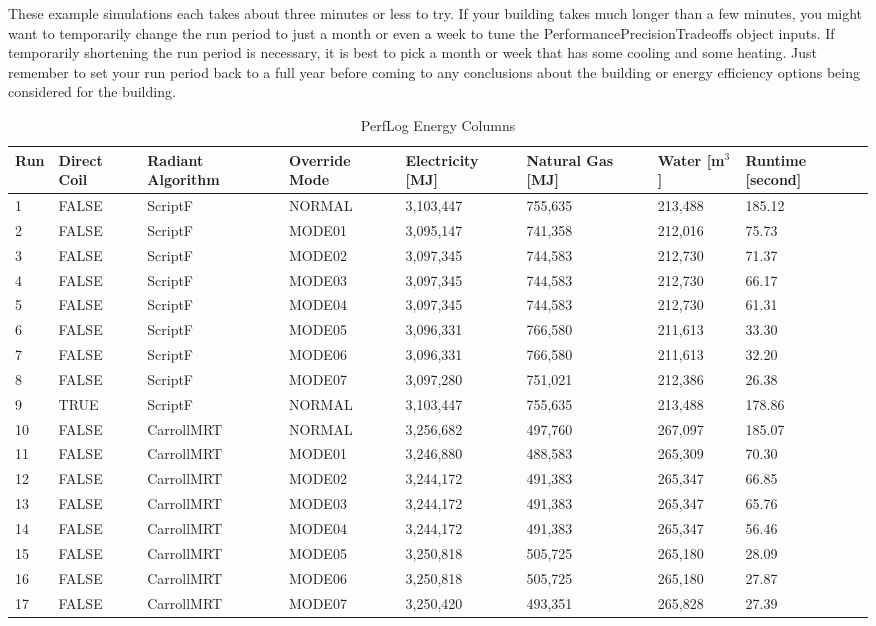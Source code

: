 These example simulations each takes about three minutes or less to try. If your building takes much longer than a few minutes, you might want to temporarily change the run period to just a month or even a week to tune the PerformancePrecisionTradeoffs object inputs. If temporarily shortening the run period is necessary, it is best to pick a month or week that has some cooling and some heating. Just remember to set your run period back to a full year before coming to any conclusions about the building or energy efficiency options being considered for the building.

{\scriptsize
\begin{longtable}[c]{p{0.2in}p{0.4in}p{0.55in}p{0.7in}p{0.5in}p{0.5in}p{0.7in}p{0.6in}}
\caption{PerfLog Energy Columns\label{table:perflog_energy_columns}} \tabularnewline
\toprule
Run &
Direct Coil &
Radiant Algorithm &
Override Mode &
  Electricity {[}MJ{]} &
  Natural Gas {[}MJ{]} &
  Water {[}m$^3${]} &
  Runtime {[}second{]} \tabularnewline
\midrule
\endfirsthead

1  & FALSE & ScriptF  & NORMAL &  3,103,447 &	 755,635 &	 213,488 &	185.12 \tabularnewline
2  & FALSE & ScriptF  & MODE01 &  3,095,147 &	 741,358 &	 212,016 &	75.73  \tabularnewline
3  & FALSE & ScriptF  & MODE02 &  3,097,345 &	 744,583 &	 212,730 &	71.37  \tabularnewline
4  & FALSE & ScriptF  & MODE03 &  3,097,345 &	 744,583 &	 212,730 &	66.17  \tabularnewline
5  & FALSE & ScriptF  & MODE04 &  3,097,345 &	 744,583 &	 212,730 &	61.31  \tabularnewline
6  & FALSE & ScriptF  & MODE05 &  3,096,331 &	 766,580 &	 211,613 &	33.30  \tabularnewline
7  & FALSE & ScriptF  & MODE06 &  3,096,331 &	 766,580 &	 211,613 &	32.20  \tabularnewline
8  & FALSE & ScriptF  & MODE07 &  3,097,280 &	 751,021 &	 212,386 &	26.38  \tabularnewline
9  & TRUE  & ScriptF  & NORMAL &  3,103,447 &	 755,635 &	 213,488 &	178.86 \tabularnewline
10 & FALSE & CarrollMRT & NORMAL & 3,256,682& 	 497,760 &	 267,097 &	185.07 \tabularnewline
11 & FALSE & CarrollMRT & MODE01 & 3,246,880& 	 488,583 &	 265,309 &	70.30  \tabularnewline
12 & FALSE & CarrollMRT & MODE02 & 3,244,172& 	 491,383 &	 265,347 &	66.85  \tabularnewline
13 & FALSE & CarrollMRT & MODE03 & 3,244,172& 	 491,383 &	 265,347 &	65.76  \tabularnewline
14 & FALSE & CarrollMRT & MODE04 & 3,244,172& 	 491,383 &	 265,347 &	56.46  \tabularnewline
15 & FALSE & CarrollMRT & MODE05 & 3,250,818& 	 505,725 &	 265,180 &	28.09  \tabularnewline
16 & FALSE & CarrollMRT & MODE06 & 3,250,818& 	 505,725 &	 265,180 &	27.87  \tabularnewline
17 & FALSE & CarrollMRT & MODE07 & 3,250,420& 	 493,351 &	 265,828 &	27.39  \tabularnewline

\bottomrule
\end{longtable}
}

